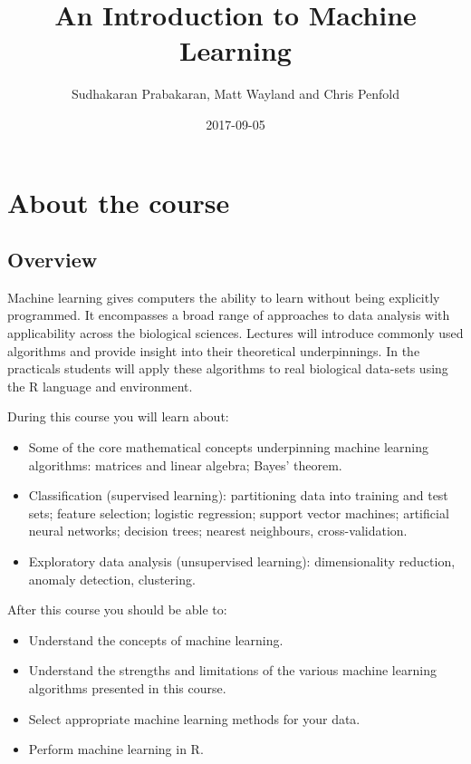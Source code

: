 \documentclass[]{book}
\title{An Introduction to Machine Learning}
\author{Sudhakaran Prabakaran, Matt Wayland and Chris Penfold}
\date{2017-09-05}
\providecommand{\tightlist}{%
  \setlength{\itemsep}{0pt}\setlength{\parskip}{0pt}}
\theoremstyle{definition}
\theoremstyle{definition}
\theoremstyle{definition}
\theoremstyle{remark}
\begin{document}
\maketitle

{
\setcounter{tocdepth}{1}
\tableofcontents
}
\chapter{About the course}\label{about-the-course}

\section{Overview}\label{overview}

Machine learning gives computers the ability to learn without being
explicitly programmed. It encompasses a broad range of approaches to
data analysis with applicability across the biological sciences.
Lectures will introduce commonly used algorithms and provide insight
into their theoretical underpinnings. In the practicals students will
apply these algorithms to real biological data-sets using the R language
and environment.

During this course you will learn about:

\begin{itemize}
\tightlist
\item
  Some of the core mathematical concepts underpinning machine learning
  algorithms: matrices and linear algebra; Bayes' theorem.
\item
  Classification (supervised learning): partitioning data into training
  and test sets; feature selection; logistic regression; support vector
  machines; artificial neural networks; decision trees; nearest
  neighbours, cross-validation.
\item
  Exploratory data analysis (unsupervised learning): dimensionality
  reduction, anomaly detection, clustering.
\end{itemize}

After this course you should be able to:

\begin{itemize}
\tightlist
\item
  Understand the concepts of machine learning.
\item
  Understand the strengths and limitations of the various machine
  learning algorithms presented in this course.
\item
  Select appropriate machine learning methods for your data.
\item
  Perform machine learning in R.
\end{itemize}
\end{document}
